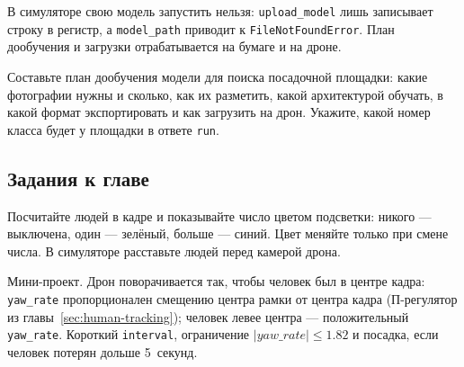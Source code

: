 В симуляторе свою модель запустить нельзя: \verb|upload_model| лишь записывает строку в регистр, а \verb|model_path| приводит к \verb|FileNotFoundError|. План дообучения и загрузки отрабатывается на бумаге и на дроне.

\begin{taskbox}
Составьте план дообучения модели для поиска посадочной площадки: какие фотографии нужны и сколько, как их разметить, какой архитектурой обучать, в какой формат экспортировать и как загрузить на дрон. Укажите, какой номер класса будет у площадки в ответе \verb|run|.
\end{taskbox}

\subsection{Задания к главе}

\begin{taskbox}
Посчитайте людей в кадре и показывайте число цветом подсветки: никого --- выключена, один --- зелёный, больше --- синий. Цвет меняйте только при смене числа. В симуляторе расставьте людей перед камерой дрона.
\end{taskbox}

\begin{taskbox}
Мини-проект. Дрон поворачивается так, чтобы человек был в центре кадра: \verb|yaw_rate| пропорционален смещению центра рамки от центра кадра (П-регулятор из главы~\ref{sec:human-tracking}); человек левее центра --- положительный \verb|yaw_rate|. Короткий \verb|interval|, ограничение $|yaw\_rate| \le 1.82$ и посадка, если человек потерян дольше 5~секунд.
\end{taskbox}

